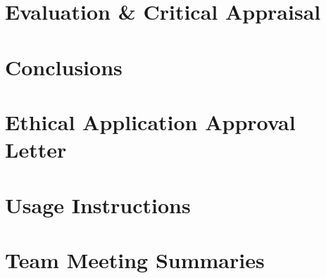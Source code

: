 \documentclass[11pt,openright,twoside,a4paper]{report}
\begin{document}
\chapter{Evaluation \& Critical Appraisal}
\label{ch:chapter-evaluation}


\chapter{Conclusions}
\label{ch:chapter-conclusions}




\let\cleardoublepage\clearpage %
\appendix

\chapter{Ethical Application Approval Letter}
\label{ch:appendix-ethical-approval-letter}


\chapter{Usage Instructions}
\label{ch:appendix-usage-instructions}


\chapter{Team Meeting Summaries}
\label{ch:appendix-team-meeting-summaries}

\end{document}
